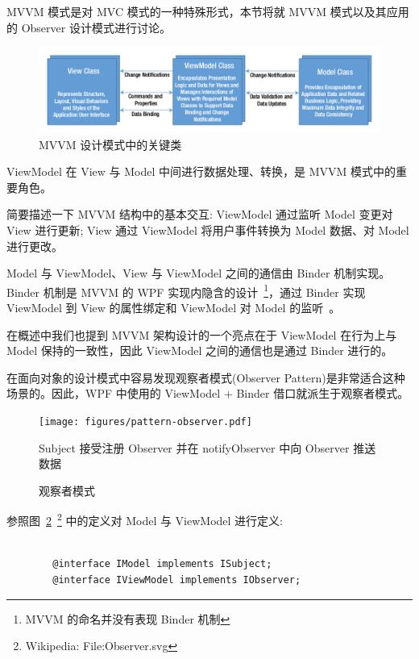 MVVM 模式是对 MVC 模式的一种特殊形式，本节将就 MVVM 模式以及其应用的 Observer 设计模式进行讨论。

\begin{figure}[!h]
  \begin{center}
    \includegraphics[scale=0.5]{figures/diagram-mvvm-pattern-ref.png}
    \caption{MVVM 设计模式中的关键类~\cite{ghoda2012windows}\label{MVVMCoreClasses}}
  \end{center}
\end{figure}

ViewModel 在 View 与 Model 中间进行数据处理、转换，是 MVVM 模式中的重要角色。

简要描述一下 MVVM 结构中的基本交互: ViewModel 通过监听 Model 变更对 View 进行更新; View 通过 ViewModel 将用户事件转换为 Model 数据、对 Model 进行更改。

Model 与 ViewModel、View 与 ViewModel 之间的通信由 Binder 机制实现。Binder 机制是 MVVM 的 WPF 实现内隐含的设计~\footnote{MVVM 的命名并没有表现 Binder 机制}，通过 Binder 实现 ViewModel 到 View 的属性绑定和 ViewModel 对 Model 的监听~\cite{Likness2010}。

在概述中我们也提到 MVVM 架构设计的一个亮点在于 ViewModel 在行为上与 Model 保持的一致性，因此 ViewModel 之间的通信也是通过 Binder 进行的。

在面向对象的设计模式中容易发现观察者模式(Observer Pattern)是非常适合这种场景的。因此，WPF 中使用的 ViewModel + Binder 借口就派生于观察者模式。

\begin{figure}[!h]
  \begin{center}
    \texttt{[image: figures/pattern-observer.pdf]}
    \caption{观察者模式\label{PatternObserver}}
    Subject 接受注册 Observer 并在 notifyObserver 中向 Observer 推送数据
  \end{center}
\end{figure}

参照图~\ref{PatternObserver}~\footnote{Wikipedia: File:Observer.svg} 中的定义对 Model 与 ViewModel 进行定义:

\begin{verbatim}

        @interface IModel implements ISubject;
        @interface IViewModel implements IObserver;

\end{verbatim}


